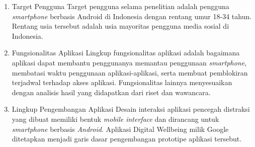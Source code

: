 \begin{enumerate}
  \item Target Pengguna
  \subitem Target pengguna selama penelitian adalah pengguna \textit{smartphone} berbasis Android di Indonesia dengan rentang umur 18-34 tahun. Rentang usia tersebut adalah usia mayoritas pengguna media sosial di Indonesia. \parencite{mediasosial2020} 
  
  \item Fungsionalitas Aplikasi
  \subitem Lingkup fungsionalitas aplikasi adalah bagaimana aplikasi dapat membantu penggunanya memantau penggunaan \textit{smartphone}, membatasi waktu penggunaan aplikasi-aplikasi, serta membuat pemblokiran terjadwal terhadap akses aplikasi. Fungsionalitas lainnya menyesuaikan dengan analisis hasil yang didapatkan dari riset dan wawancara. 
   
  \item Lingkup Pengembangan Aplikasi
  \subitem Desain interaksi aplikasi pencegah distraksi yang dibuat memiliki bentuk \textit{mobile interface} dan dirancang untuk \textit{smartphone} berbasis \textit{Android}. Aplikasi Digital Wellbeing milik Google ditetapkan menjadi garis dasar pengembangan prototipe aplikasi tersebut.

\end{enumerate}





\newpage

